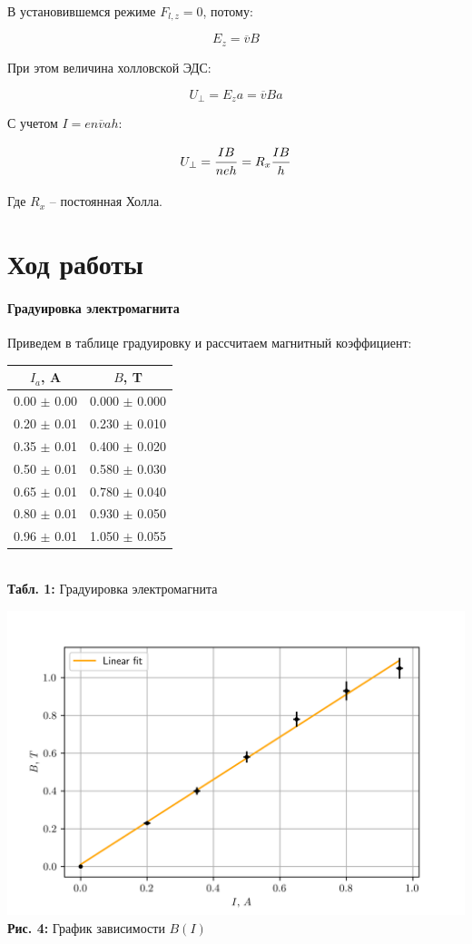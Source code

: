 \documentclass[12pt,a4paper]{scrartcl}
\begin{document}
	В установившемся режиме $F_{l, z} = 0$, потому:
	
	$$E_z = \overline{v} B$$
	
	При этом величина холловской ЭДС:
	
	$$U_\perp = E_z a = \overline{v} B a$$
	
	С учетом $I = en\overline{v}ah$:
	
	$$U_{\perp} = \dfrac{\strut IB}{\strut neh} = R_x\dfrac{\strut IB}{\strut h}$$
	
	Где $R_x$ -- постоянная Холла.
	
	\section{Ход работы}
	
	\paragraph{Градуировка электромагнита} \hfill
	
	Приведем в таблице градуировку и рассчитаем магнитный коэффициент:
	
	\begin{center}
		\begin{tabular}{|c|c|}
			\hline
			$I_a$, A & $B$, T
			\\\hline
			0.00 $\pm$ 0.00 & 0.000 $\pm$ 0.000
			\\\hline
			0.20 $\pm$ 0.01 & 0.230 $\pm$ 0.010
			\\\hline
			0.35 $\pm$ 0.01 & 0.400 $\pm$ 0.020
			\\\hline
			0.50 $\pm$ 0.01 & 0.580 $\pm$ 0.030
			\\\hline
			0.65 $\pm$ 0.01 & 0.780 $\pm$ 0.040
			\\\hline
			0.80 $\pm$ 0.01 & 0.930 $\pm$ 0.050
			\\\hline
			0.96 $\pm$ 0.01 & 1.050 $\pm$ 0.055
			\\\hline
		\end{tabular}
		\\\textbf{Табл. 1:} Градуировка электромагнита
	\end{center}
	
	\begin{center}
		\includegraphics[scale=0.7]{PIC_4.png}
		\\\textbf{Рис. 4:} График зависимости $B(I)$
	\end{center}
\end{document}
